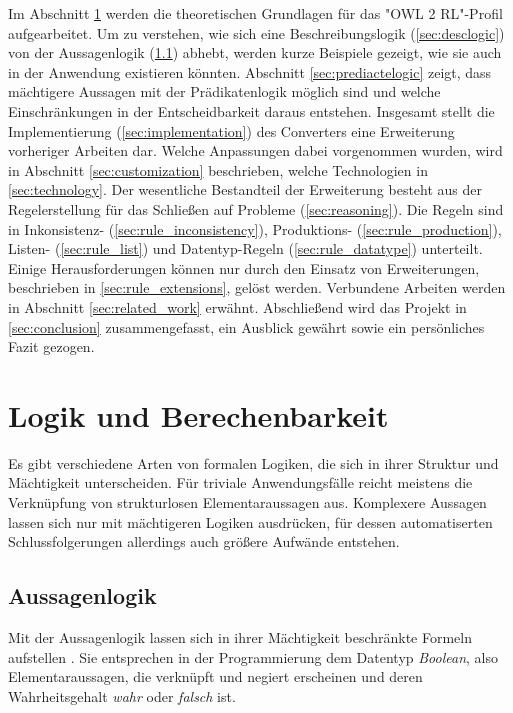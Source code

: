 \documentclass[runningheads,a4paper]{llncs}
\begin{document}
Im Abschnitt \ref{sec:logic} werden die theoretischen Grundlagen für das "{}OWL 2 RL"{}-Profil aufgearbeitet. 
Um zu verstehen, wie sich eine Beschreibungslogik (\ref{sec:desclogic}) von der Aussagenlogik (\ref{sec:aussagenlogik}) abhebt, werden kurze Beispiele gezeigt, wie sie auch in der Anwendung existieren könnten.
Abschnitt \ref{sec:prediactelogic} zeigt, dass mächtigere Aussagen mit der Prädikatenlogik möglich sind und welche Einschränkungen in der Entscheidbarkeit daraus entstehen.
Insgesamt stellt die Implementierung (\ref{sec:implementation}) des Converters eine Erweiterung vorheriger Arbeiten dar.
Welche Anpassungen dabei vorgenommen wurden, wird in Abschnitt \ref{sec:customization} beschrieben, welche Technologien in \ref{sec:technology}.
Der wesentliche Bestandteil der Erweiterung besteht aus der Regelerstellung für das Schließen auf Probleme (\ref{sec:reasoning}).
Die Regeln sind in Inkonsistenz- (\ref{sec:rule_inconsistency}), Produktions- (\ref{sec:rule_production}), Listen- (\ref{sec:rule_list}) und Datentyp-Regeln (\ref{sec:rule_datatype}) unterteilt.
Einige Herausforderungen können nur durch den Einsatz von Erweiterungen, beschrieben in \ref{sec:rule_extensions}, gelöst werden.
Verbundene Arbeiten werden in Abschnitt \ref{sec:related_work} erwähnt.
Abschließend wird das Projekt in \ref{sec:conclusion} zusammengefasst, ein Ausblick gewährt sowie ein persönliches Fazit gezogen.

\newpage
\section{Logik und Berechenbarkeit}
\label{sec:logic}

Es gibt verschiedene Arten von formalen Logiken, die sich in ihrer Struktur und Mächtigkeit unterscheiden.
Für triviale Anwendungsfälle reicht meistens die Verknüpfung von strukturlosen Elementaraussagen aus.
Komplexere Aussagen lassen sich nur mit mächtigeren Logiken ausdrücken, für dessen automatiserten Schlussfolgerungen allerdings auch größere Aufwände entstehen.

\subsection{Aussagenlogik}
\label{sec:aussagenlogik}

Mit der Aussagenlogik lassen sich in ihrer Mächtigkeit beschränkte Formeln aufstellen \cite[p. 6,373]{foundations}. Sie entsprechen in der Programmierung dem Datentyp \textit{Boolean}, also Elementaraussagen, die verknüpft und negiert erscheinen und deren Wahrheitsgehalt \textit{wahr} oder \textit{falsch} ist.
\end{document}
